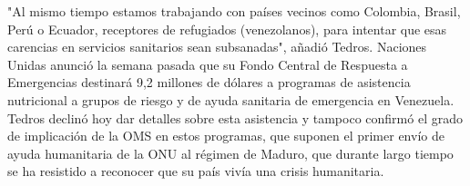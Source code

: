 \documentclass{article}%
\begin{document}
%
"Al mismo tiempo estamos trabajando con países vecinos como Colombia, Brasil, Perú o Ecuador, receptores de refugiados (venezolanos), para intentar que esas carencias en servicios sanitarios sean subsanadas", añadió Tedros.%
\newline%
%
Naciones Unidas anunció la semana pasada que su Fondo Central de Respuesta a Emergencias destinará 9,2 millones de dólares a programas de asistencia nutricional a grupos de riesgo y de ayuda sanitaria de emergencia en Venezuela.%
\newline%
%
Tedros declinó hoy dar detalles sobre esta asistencia y tampoco confirmó el grado de implicación de la OMS en estos programas, que suponen el primer envío de ayuda humanitaria de la ONU al régimen de Maduro, que durante largo tiempo se ha resistido a reconocer que su país vivía una crisis humanitaria.%
\newline%
%
\end{document}
